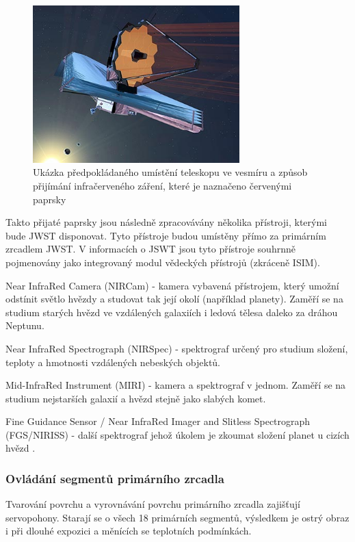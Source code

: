 \documentclass[a4paper,11pt]{article}
\begin{document}
\begin{figure}[h]
\begin{center}
\includegraphics[width=8cm]{webbPaprsky2.eps}
\caption{Ukázka předpokládaného umístění teleskopu ve vesmíru a způsob přijímání infračerveného záření, které je naznačeno červenými paprsky}
\label{paprskyWebb2}
\end{center}
\end{figure}

Takto přijaté paprsky jsou následně zpracovávány několika přístroji, kterými bude JWST disponovat. Tyto přístroje budou umístěny přímo za primárním zrcadlem JWST. V informacích o JSWT jsou tyto přístroje souhrnně pojmenovány jako integrovaný modul vědeckých přístrojů (zkráceně ISIM). 

Near InfraRed Camera (NIRCam) - kamera vybavená přístrojem, který umožní odstínit světlo hvězdy a studovat tak její okolí (například planety). Zaměří se na studium starých hvězd ve vzdálených galaxiích i ledová tělesa daleko za dráhou Neptunu.

Near InfraRed Spectrograph (NIRSpec) - spektrograf určený pro studium složení, teploty a hmotnosti vzdálených nebeských objektů.

Mid-InfraRed Instrument (MIRI) - kamera a spektrograf v jednom. Zaměří se na studium nejstarších galaxií a hvězd stejně jako slabých komet.

Fine Guidance Sensor / Near InfraRed Imager and Slitless Spectrograph (FGS/NIRISS) - další spektrograf jehož úkolem je zkoumat složení planet u cizích hvězd \cite{abcko}.

\subsubsection{Ovládání segmentů primárního zrcadla}
Tvarování povrchu a vyrovnávání povrchu primárního zrcadla zajišťují servopohony. Starají se o všech 18 primárních segmentů, výsledkem je ostrý obraz i při dlouhé expozici a měnících se teplotních podmínkách.
\end{document}
